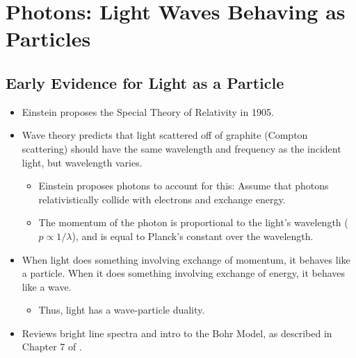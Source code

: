 \documentclass[../notes.tex]{subfiles}
\begin{document}
\chapter{Photons: Light Waves Behaving as Particles}
\section{Early Evidence for Light as a Particle}
\begin{itemize}
    \item {}Einstein proposes the Special Theory of Relativity in 1905.
    \item Wave theory predicts that light scattered off of graphite (Compton scattering) should have the same wavelength and frequency as the incident light, but wavelength varies.
    \begin{itemize}
        \item Einstein proposes photons to account for this: Assume that photons relativistically collide with electrons and exchange energy.
        \item The momentum of the photon is proportional to the light's wavelength ($p\propto 1/\lambda$), and is equal to Planck's constant over the wavelength.
    \end{itemize}
    \item When light does something involving exchange of momentum, it behaves like a particle. When it does something involving exchange of energy, it behaves like a wave.
    \begin{itemize}
        \item Thus, light has a wave-particle duality.
    \end{itemize}
    \item Reviews bright line spectra and intro to the Bohr Model, as described in Chapter 7 of \textcite{bib:APChemNotes}.
\end{itemize}
\end{document}
